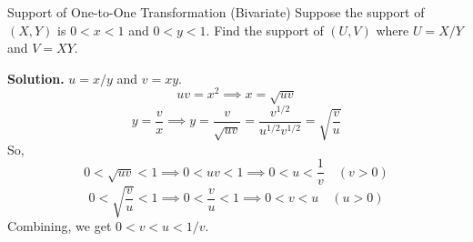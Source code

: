 \begin{Example}{Support of One-to-One Transformation (Bivariate)}{}
    Suppose the support of $ (X,Y) $ is $ 0<x<1 $
    and $ 0<y<1 $. Find the support of $ (U,V) $
    where $ U=X/Y $ and $ V=XY $.

    \textbf{Solution.} $ u=x/y $ and $ v=xy $.
    \[ uv=x^2\implies x=\sqrt{uv} \]
    \[ y=\frac{v}{x} \implies y=\frac{v}{\sqrt{uv}}
        =\frac{v^{1/2}}{u^{1/2}v^{1/2}}=\sqrt{\frac{v}{u}}  \]
    So,
    \[ 0<\sqrt{uv}<1\implies 0<uv<1\implies 0<u<\frac{1}{v}\quad (v>0) \]
    \[ 0<\sqrt{\frac{v}{u}}<1\implies 0<\frac{v}{u}<1\implies 0<v<u\quad (u>0) \]
    Combining, we get $ 0<v<u<1/v $.
\end{Example}
